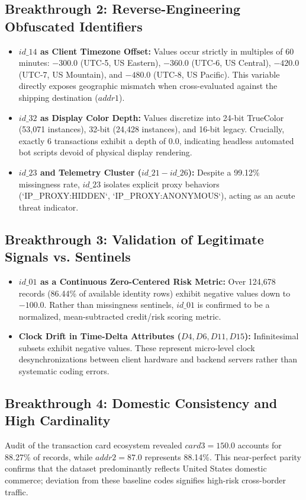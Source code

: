\documentclass[conference]{IEEEtran}
\begin{document}
\subsection{Breakthrough 2: Reverse-Engineering Obfuscated Identifiers}
\begin{itemize}
    \item \textbf{$id\_14$ as Client Timezone Offset:} Values occur strictly in multiples of 60 minutes: $-300.0$ (UTC-5, US Eastern), $-360.0$ (UTC-6, US Central), $-420.0$ (UTC-7, US Mountain), and $-480.0$ (UTC-8, US Pacific). This variable directly exposes geographic mismatch when cross-evaluated against the shipping destination ($addr1$).
    \item \textbf{$id\_32$ as Display Color Depth:} Values discretize into 24-bit TrueColor (53,071 instances), 32-bit (24,428 instances), and 16-bit legacy. Crucially, exactly 6 transactions exhibit a depth of $0.0$, indicating headless automated bot scripts devoid of physical display rendering.
    \item \textbf{$id\_23$ and Telemetry Cluster ($id\_21-id\_26$):} Despite a 99.12\% missingness rate, $id\_23$ isolates explicit proxy behaviors (`IP\_PROXY:HIDDEN`, `IP\_PROXY:ANONYMOUS`), acting as an acute threat indicator.
\end{itemize}

\subsection{Breakthrough 3: Validation of Legitimate Signals vs. Sentinels}
\begin{itemize}
    \item \textbf{$id\_01$ as a Continuous Zero-Centered Risk Metric:} Over 124,678 records (86.44\% of available identity rows) exhibit negative values down to $-100.0$. Rather than missingness sentinels, $id\_01$ is confirmed to be a normalized, mean-subtracted credit/risk scoring metric.
    \item \textbf{Clock Drift in Time-Delta Attributes ($D4, D6, D11, D15$):} Infinitesimal subsets exhibit negative values. These represent micro-level clock desynchronizations between client hardware and backend servers rather than systematic coding errors.
\end{itemize}

\subsection{Breakthrough 4: Domestic Consistency and High Cardinality}
Audit of the transaction card ecosystem revealed $card3 = 150.0$ accounts for 88.27\% of records, while $addr2 = 87.0$ represents 88.14\%. This near-perfect parity confirms that the dataset predominantly reflects United States domestic commerce; deviation from these baseline codes signifies high-risk cross-border traffic.
\end{document}
